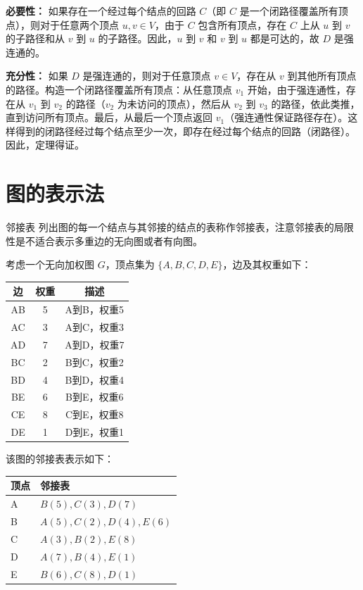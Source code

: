 \documentclass[lang=cn,11pt]{elegantbook}
\begin{document}
\textbf{必要性：} 如果存在一个经过每个结点的回路 $C$（即 $C$ 是一个闭路径覆盖所有顶点），则对于任意两个顶点 $u, v \in V$，由于 $C$ 包含所有顶点，存在 $C$ 上从 $u$ 到 $v$ 的子路径和从 $v$ 到 $u$ 的子路径。因此，$u$ 到 $v$ 和 $v$ 到 $u$ 都是可达的，故 $D$ 是强连通的。

\textbf{充分性：} 如果 $D$ 是强连通的，则对于任意顶点 $v \in V$，存在从 $v$ 到其他所有顶点的路径。构造一个闭路径覆盖所有顶点：从任意顶点 $v_1$ 开始，由于强连通性，存在从 $v_1$ 到 $v_2$ 的路径（$v_2$ 为未访问的顶点），然后从 $v_2$ 到 $v_3$ 的路径，依此类推，直到访问所有顶点。最后，从最后一个顶点返回 $v_1$（强连通性保证路径存在）。这样得到的闭路径经过每个结点至少一次，即存在经过每个结点的回路（闭路径）。因此，定理得证。

\section{图的表示法}
\begin{definition}{邻接表}
    列出图的每一个结点与其邻接的结点的表称作邻接表，注意邻接表的局限性是不适合表示多重边的无向图或者有向图。
\end{definition}
考虑一个无向加权图 $G$，顶点集为 $\{A, B, C, D, E\}$，边及其权重如下：
\begin{center}
\begin{tabular}{c|c|c}
边 & 权重 & 描述 \\
\hline
AB & 5 & A到B，权重5 \\
AC & 3 & A到C，权重3 \\
AD & 7 & A到D，权重7 \\
BC & 2 & B到C，权重2 \\
BD & 4 & B到D，权重4 \\
BE & 6 & B到E，权重6 \\
CE & 8 & C到E，权重8 \\
DE & 1 & D到E，权重1 \\
\end{tabular}
\end{center}
该图的邻接表表示如下：
\begin{center}
\begin{tabular}{l|l}
顶点 & 邻接表 \\
\hline
A & $B(5) , C(3) , D(7)$ \\
B & $A(5) , C(2) , D(4) , E(6)$ \\
C & $A(3) , B(2) , E(8)$ \\
D & $A(7) , B(4) , E(1)$ \\
E & $B(6) , C(8) , D(1)$ \\
\end{tabular}
\end{center}
\end{document}
